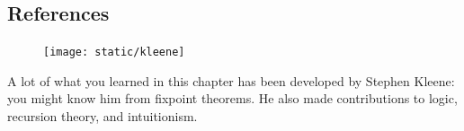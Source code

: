 %  
%  
%  
%  
%  
%  
%  
%  
%  
%  



\subsection{References}

\setlength{\intextsep}{0pt}
\begin{figure}
\texttt{[image: static/kleene]}
\end{figure}


A lot of what you learned in this chapter has been developed by
Stephen Kleene: you might know him from fixpoint theorems. He also made contributions to logic, recursion theory, and intuitionism.

